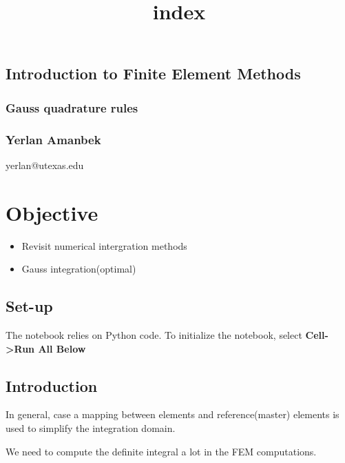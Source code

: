 \documentclass[11pt]{article}
\title{index}
\providecommand{\tightlist}{%
      \setlength{\itemsep}{0pt}\setlength{\parskip}{0pt}}
\begin{document}
    
    
    \maketitle
    
    

    
    \subsection{Introduction to Finite Element
Methods}\label{introduction-to-finite-element-methods}

\subsubsection{Gauss quadrature rules}\label{gauss-quadrature-rules}

\subsubsection{Yerlan Amanbek}\label{yerlan-amanbek}

 yerlan@utexas.edu 

    \section{Objective}\label{objective}

\begin{itemize}
\tightlist
\item
  Revisit numerical intergration methods
\item
  Gauss integration(optimal)
\end{itemize}

\subsection{Set-up}\label{set-up}

The notebook relies on Python code. To initialize the notebook, select
\textbf{Cell-\textgreater{}Run All Below}

    \subsection{Introduction}\label{introduction}

In general, case a mapping between elements and reference(master)
elements is used to simplify the integration domain.

We need to compute the definite integral a lot in the FEM computations.
\end{document}
